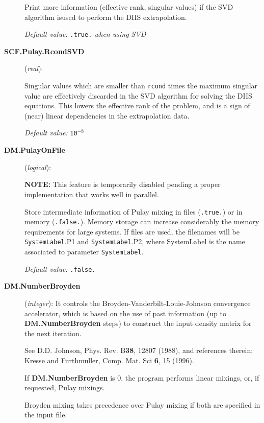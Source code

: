\documentclass[11pt]{article}
\begin{document}
\begin{description}
Print more information (effective rank, singular values) if the SVD algorithm
isused to perform the DIIS extrapolation.

{\it Default value:} {{\tt .true.} {\it when using SVD}}

\item[{\bf SCF.Pulay.RcondSVD}] ({\it real}):

Singular values which are smaller than {\tt rcond} times the maximum
singular value are effectively discarded in the SVD algorithm for
solving the DIIS equations. This lowers the effective rank of the
problem, and is a sign of (near) linear dependencies in the
extrapolation data.

{\it Default value:} {\tt 10$^{-8}$}


\item[{\bf DM.PulayOnFile}] ({\it logical}):

{\bf NOTE:} This feature is temporarily disabled pending a proper
implementation that works well in parallel.

Store intermediate information of Pulay mixing in files
({\tt .true.}) or in memory ({\tt .false.}).
Memory storage can increase considerably the
memory requirements for large systems.
If files are used, the filenames will be
{\tt SystemLabel}.P1 and
{\tt SystemLabel}.P2,
where SystemLabel is the name associated
to parameter {\tt SystemLabel}.

{\it Default value:} {\tt .false.}



\item[{\bf DM.NumberBroyden}] ({\it integer}):
It controls the Broyden-Vanderbilt-Louie-Johnson
convergence accelerator, which is based on the use of past information
(up to {\bf DM.NumberBroyden} steps) to construct the input density
matrix for the next iteration.

See D.D. Johnson, Phys. Rev. B{\bf 38}, 12807 (1988), and references therein;
Kresse and Furthmuller, Comp. Mat. Sci {\bf 6}, 15 (1996).

If {\bf DM.NumberBroyden} is 0, the program performs linear mixings,
or, if requested, Pulay mixings.

Broyden mixing takes precedence over Pulay mixing if both are
specified in the input file.


\end{description}
\end{document}
